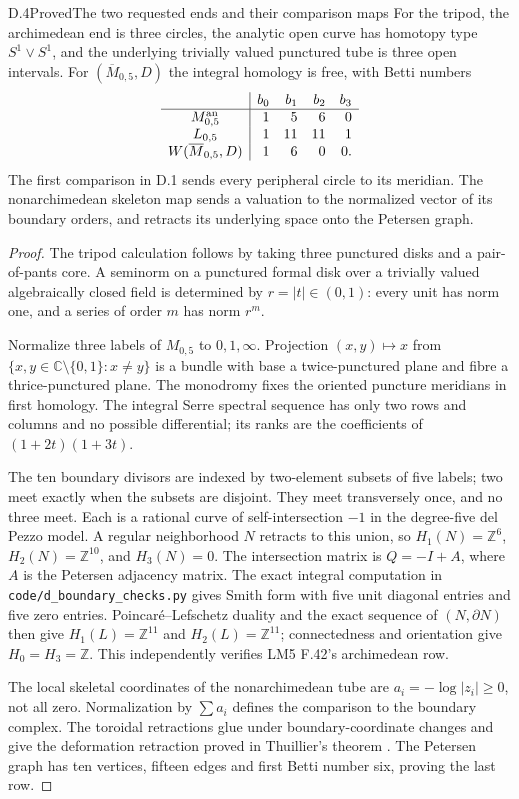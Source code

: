 \begin{result}{D.4}{Proved}{The two requested ends and their comparison maps}
For the tripod, the archimedean end is three circles, the analytic open curve has homotopy type $S^1\vee S^1$, and the underlying trivially valued punctured tube is three open intervals. For $(\overline M_{0,5},D)$ the integral homology is free, with Betti numbers
\[
\begin{array}{c|rrrr}
 &b_0&b_1&b_2&b_3\\\hline
 M_{0,5}^{\rm an}&1&5&6&0\\
 L_{0,5}&1&11&11&1\\
 W(\overline M_{0,5},D)&1&6&0&0.
\end{array}
\]
The first comparison in D.1 sends every peripheral circle to its meridian. The nonarchimedean skeleton map sends a valuation to the normalized vector of its boundary orders, and retracts its underlying space onto the Petersen graph.
\end{result}
\begin{proof}
The tripod calculation follows by taking three punctured disks and a pair-of-pants core. A seminorm on a punctured formal disk over a trivially valued algebraically closed field is determined by $r=|t|\in(0,1)$: every unit has norm one, and a series of order $m$ has norm $r^m$.

Normalize three labels of $M_{0,5}$ to $0,1,\infty$. Projection $(x,y)\mapsto x$ from $\{x,y\in\mathbb C\setminus\{0,1\}:x\ne y\}$ is a bundle with base a twice-punctured plane and fibre a thrice-punctured plane. The monodromy fixes the oriented puncture meridians in first homology. The integral Serre spectral sequence has only two rows and columns and no possible differential; its ranks are the coefficients of $(1+2t)(1+3t)$.

The ten boundary divisors are indexed by two-element subsets of five labels; two meet exactly when the subsets are disjoint. They meet transversely once, and no three meet. Each is a rational curve of self-intersection $-1$ in the degree-five del Pezzo model. A regular neighborhood $N$ retracts to this union, so $H_1(N)=\mathbb Z^6$, $H_2(N)=\mathbb Z^{10}$, and $H_3(N)=0$. The intersection matrix is $Q=-I+A$, where $A$ is the Petersen adjacency matrix. The exact integral computation in \texttt{code/d\_boundary\_checks.py} gives Smith form with five unit diagonal entries and five zero entries. Poincar\'e--Lefschetz duality and the exact sequence of $(N,\partial N)$ then give $H_1(L)=\mathbb Z^{11}$ and $H_2(L)=\mathbb Z^{11}$; connectedness and orientation give $H_0=H_3=\mathbb Z$. This independently verifies LM5 F.42's archimedean row.

The local skeletal coordinates of the nonarchimedean tube are $a_i=-\log|z_i|\geq0$, not all zero. Normalization by $\sum a_i$ defines the comparison to the boundary complex. The toroidal retractions glue under boundary-coordinate changes and give the deformation retraction proved in Thuillier's theorem \cite[Theorem~3.25 and Proposition~4.5]{Thuillier2007}. The Petersen graph has ten vertices, fifteen edges and first Betti number six, proving the last row.
\end{proof}

